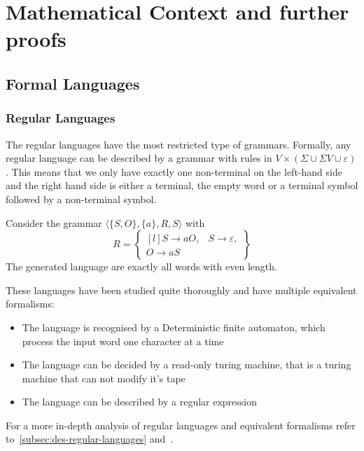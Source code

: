 \chapter{Mathematical Context and further proofs}\label{ch:mathematical-context-and-further-proofs}

\section{Formal Languages}\label{sec:formal-languages-app}

\subsection{Regular Languages}\label{subsec:regular-languages}

The regular languages have the most restricted type of grammars.
Formally, any regular language can be described by a grammar with rules in $V\times(\Sigma \cup \Sigma V \cup \varepsilon)$.
This means that we only have exactly one non-terminal on the left-hand side and the right hand side is either a terminal, the empty word or a terminal symbol followed by a non-terminal symbol.

\begin{exmp}
    Consider the grammar $\langle \{S, O\}, \{a\}, R, S \rangle$ with
    \[
        R = \begin{Bmatrix*}[l]
                S \to aO,
                &S \to \varepsilon, \\
                O \to aS
        \end{Bmatrix*}
    \]
    The generated language are exactly all words with even length.
\end{exmp}

These languages have been studied quite thoroughly and have multiple equivalent formalisms:
\begin{itemize}
    \setlength\itemsep{0.2em}
    \item The language is recognised by a Deterministic finite automaton, which process the input word one character at a time
    \item The language can be decided by a read-only turing machine, that is a turing machine that can not modify it's tape
    \item The language can be described by a regular expression
\end{itemize}

For a more in-depth analysis of regular languages and equivalent formalisms refer to~\cref{subsec:des-regular-languages} and~\cite{Straubing1994}.

